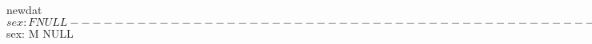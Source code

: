 \begin{Schunk}
\begin{Soutput}
newdat$sex: F
NULL
--------------------------------------------------------------------------- 
newdat$sex: M
NULL
\end{Soutput}
\end{Schunk}
